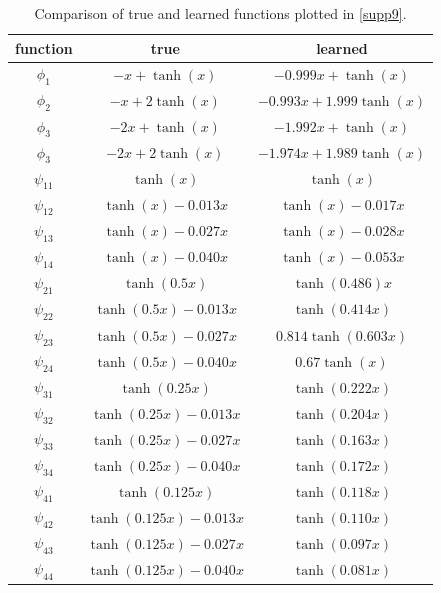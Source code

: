 \documentclass[10pt,twocolumn]{article}
\begin{document}
\begin{table}[h]
\centering
\footnotesize
\begin{tabular}{|c|c|c|}
\hline
\textbf{function} & \textbf{true} & \textbf{learned} \\
\hline
$\phi_1$ & $-x + \tanh (x)$ & $-0.999x + \tanh (x)$ \\
\hline
$\phi_2$ & $-x + 2\tanh (x)$ & $-0.993x +1.999\tanh (x)$\\
\hline
$\phi_3$ & $-2x + \tanh (x)$ & $-1.992x +\tanh (x)$ \\
\hline
$\phi_3$ & $-2x + 2\tanh (x)$ & $-1.974x +1.989\tanh (x)$ \\
\hline
$\psi_{11}$ & $\tanh (x)$ & $\tanh (x)$ \\
\hline
$\psi_{12}$ & $\tanh (x) - 0.013 x$ & $\tanh (x) - 0.017x$ \\
\hline
$\psi_{13}$ & $\tanh (x) - 0.027 x$ & $\tanh (x) -0.028x$ \\
\hline
$\psi_{14}$ & $\tanh (x) - 0.040 x$ & $\tanh (x) -0.053x$ \\
\hline
$\psi_{21}$ & $\tanh (0.5x)$ & $\tanh (0.486)x$ \\
\hline
$\psi_{22}$ & $\tanh (0.5x) - 0.013 x$ & $\tanh(0.414x)$ \\
\hline
$\psi_{23}$ & $\tanh (0.5x) - 0.027 x$ & $0.814 \tanh (0.603x)$ \\
\hline
$\psi_{24}$ & $\tanh (0.5x) - 0.040 x$ & $0.67 \tanh (x)$ \\
\hline
$\psi_{31}$ & $\tanh (0.25x)$ & $\tanh (0.222x)$ \\
\hline
$\psi_{32}$ & $\tanh (0.25x) - 0.013 x$ & $\tanh (0.204x)$ \\
\hline
$\psi_{33}$ & $\tanh (0.25x) - 0.027 x$ & $\tanh (0.163x)$ \\
\hline
$\psi_{34}$ & $\tanh (0.25x) - 0.040 x$ & $\tanh (0.172x)$ \\
\hline
$\psi_{41}$ & $\tanh (0.125x)$ & $\tanh (0.118x)$ \\
\hline
$\psi_{42}$ & $\tanh (0.125x) - 0.013 x$ & $\tanh (0.110x)$ \\
\hline
$\psi_{43}$ & $\tanh (0.125x) - 0.027 x$ & $\tanh (0.097x)$ \\
\hline
$\psi_{44}$ & $\tanh (0.125x) - 0.040 x$ & $\tanh (0.081x)$ \\
\hline
\end{tabular}
\caption{Comparison of true and learned functions plotted in \cref{supp9}.}
\label{table3}
\end{table}
\end{document}
